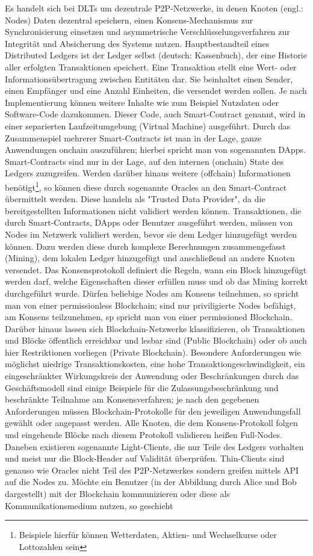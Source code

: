 Es handelt sich bei \ac{DLT}s um dezentrale \ac{P2P}-Netzwerke, in denen Knoten (engl.: Nodes) Daten dezentral speichern, einen Konsens-Mechanismus zur Synchronisierung einsetzen und asymmetrische Verschlüsselungsverfahren zur Integrität und Absicherung des Systems nutzen. Hauptbestandteil eines Distributed Ledgers ist der Ledger selbst (deutsch: Kassenbuch), der eine Historie aller erfolgten Transaktionen speichert. Eine Transaktion stellt eine Wert- oder Informationsübertragung zwischen Entitäten dar. Sie beinhaltet einen Sender, einen Empfänger und eine Anzahl Einheiten, die versendet werden sollen. Je nach Implementierung können weitere Inhalte wie zum Beispiel Nutzdaten oder Software-Code dazukommen. Dieser Code, auch Smart-Contract genannt, wird in einer separierten Laufzeitumgebung (Virtual Machine) ausgeführt. Durch das Zusammenspiel mehrerer Smart-Contracts ist man in der Lage, ganze Anwendungen onchain auszuführen; hierbei spricht man von sogenannten \ac{DApp}s. Smart-Contracts sind nur in der Lage, auf den internen (onchain) State des Ledgers zuzugreifen. Werden darüber hinaus weitere (offchain) Informationen benötigt\footnote{Beispiele hierfür können Wetterdaten, Aktien- und Wechselkurse oder Lottozahlen sein}, so können diese durch sogenannte Oracles an den Smart-Contract übermittelt werden. Diese handeln als "Trusted Data Provider", da die bereitgestellten Informationen nicht validiert werden können. Transaktionen, die durch Smart-Contracts, \ac{DApp}s oder Benutzer ausgeführt werden, müssen von Nodes im Netzwerk validiert werden, bevor sie dem Ledger hinzugefügt werden können. Dazu werden diese durch komplexe Berechnungen zusammengefasst (Mining), dem lokalen Ledger hinzugefügt und anschließend an andere Knoten versendet. Das Konsensprotokoll definiert die Regeln, wann ein Block hinzugefügt werden darf, welche Eigenschaften dieser erfüllen muss und ob das Mining korrekt durchgeführt wurde. Dürfen beliebige Nodes am Konsens teilnehmen, so spricht man von einer permissionless Blockchain; sind nur priviligierte Nodes befähigt, am Konsens teilzunehmen, sp spricht man von einer permissioned Blockchain. Darüber hinaus lassen sich Blockchain-Netzwerke klassifizieren, ob Transaktionen und Blöcke öffentlich erreichbar und lesbar sind (Public Blockchain) oder ob auch hier Restriktionen vorliegen (Private Blockchain). Besondere Anforderungen wie möglichst niedrige Transaktionskosten, eine hohe Transaktiongeschwindigkeit, ein eingeschränkter Wirkungskreis der Anwendung oder Beschränkungen durch das Geschäftsmodell sind einige Beispiele für die Zulassungsbeschränkung und beschränkte Teilnahme am Konsensverfahren; je nach den gegebenen Anforderungen müssen Blockchain-Protokolle für den jeweiligen Anwendungsfall gewählt oder angepasst werden. Alle Knoten, die dem Konsens-Protokoll folgen und eingehende Blöcke nach diesem Protokoll validieren heißen Full-Nodes. Daneben existieren sogenannte Light-Clients, die nur Teile des Ledgers vorhalten und meist nur die Block-Header auf Validität überprüfen. Thin-Clients sind genauso wie Oracles nicht Teil des \ac{P2P}-Netzwerkes sondern greifen mittels \ac{API} auf die Nodes zu. Möchte ein Benutzer (in der Abbildung durch Alice und Bob dargestellt) mit der Blockchain kommunizieren oder diese als Kommunikationsmedium nutzen, so geschieht 
